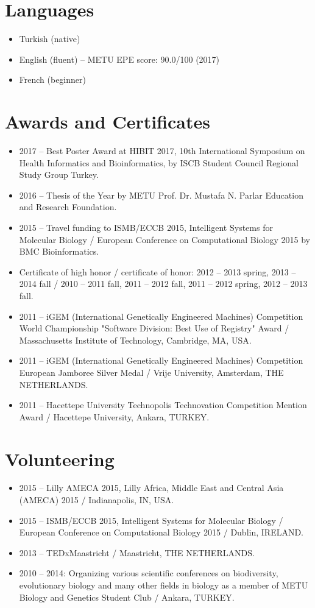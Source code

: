 \documentclass[a4paper,12pt]{article}
\newcommand{\resumeItemNoTitle}[1]{
  \item\small{
    {#1\vspace{-2pt}}
  }
}
\newcommand{\resumeSubItemSingle}[1]{\resumeItemNoTitle{#1}\vspace{-4pt}}
\newcommand{\resumeSubHeadingListStart}{\begin{itemize}[leftmargin=*]}
\newcommand{\resumeSubHeadingListEnd}{\end{itemize}}
\begin{document}
\section{Languages}
  \resumeSubHeadingListStart
    \resumeSubItemSingle{Turkish (native)}
    \resumeSubItemSingle{English (fluent) -- METU EPE score: 90.0/100 (2017)}
    \resumeSubItemSingle{French (beginner)}
  \resumeSubHeadingListEnd

\section{Awards and Certificates}
  \resumeSubHeadingListStart
    \resumeSubItemSingle{2017 -- Best Poster Award at HIBIT 2017, 10th International Symposium on Health Informatics and Bioinformatics, by ISCB Student Council Regional Study Group Turkey.}
    \resumeSubItemSingle{2016 -- Thesis of the Year by METU Prof. Dr. Mustafa N. Parlar Education and Research Foundation.}
    \resumeSubItemSingle{2015 -- Travel funding to ISMB/ECCB 2015, Intelligent Systems for Molecular Biology / European Conference on Computational Biology 2015 by BMC Bioinformatics.}
    \resumeSubItemSingle{Certificate of high honor / certificate of honor:  2012 -- 2013 spring, 2013 -- 2014 fall / 2010 -- 2011 fall, 2011 -- 2012 fall, 2011 -- 2012 spring, 2012 -- 2013 fall.}
    \resumeSubItemSingle{2011 -- iGEM (International Genetically Engineered Machines) Competition World Championship "Software Division: Best Use of Registry" Award / Massachusetts Institute of Technology, Cambridge, MA, USA.}
    \resumeSubItemSingle{2011 -- iGEM (International Genetically Engineered Machines) Competition European Jamboree Silver Medal / Vrije University, Amsterdam, THE NETHERLANDS.}
    \resumeSubItemSingle{2011 -- Hacettepe University Technopolis Technovation Competition Mention Award / Hacettepe University, Ankara, TURKEY.}
  \resumeSubHeadingListEnd

\section{Volunteering}
  \resumeSubHeadingListStart
    \resumeSubItemSingle{2015 -- Lilly AMECA 2015, Lilly Africa, Middle East and Central Asia (AMECA) 2015 / Indianapolis, IN, USA.}
    \resumeSubItemSingle{2015 -- ISMB/ECCB 2015, Intelligent Systems for Molecular Biology / European Conference on Computational Biology 2015 / Dublin, IRELAND.}
    \resumeSubItemSingle{2013 -- TEDxMaastricht / Maastricht, THE NETHERLANDS.}
    \resumeSubItemSingle{2010 -- 2014: Organizing various scientific conferences on biodiversity, evolutionary biology and many other fields in biology as a member of METU Biology and Genetics Student Club / Ankara, TURKEY.}
  \resumeSubHeadingListEnd
\end{document}
